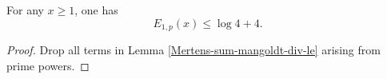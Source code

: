 \begin{corollary}
\label{Mertens-first-error-prime-le}
\leanok
For any $x \geq 1$, one has
$$ E_{1,p}(x) \leq \log 4 + 4.$$
\end{corollary}
\begin{proof}
\leanok
Drop all terms in Lemma \ref{Mertens-sum-mangoldt-div-le} arising from prime powers.
\end{proof}
